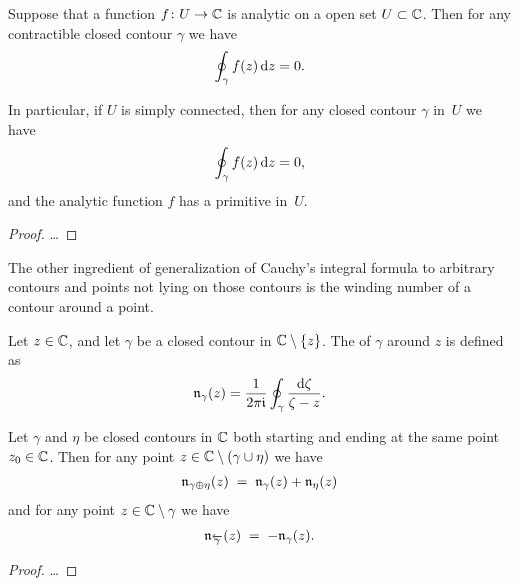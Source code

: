 \begin{theorem}
  \label{thm:cauchy_theorem}
  Suppose that a function $f \colon U \to \mathbb{C}$ is analytic on a open
  set $U \subset \mathbb{C}$.
  Then for any contractible closed contour $\gamma$ we have
  \begin{align*}
    \oint_\gamma f(z) \, \mathrm{d} z = 0 .
  \end{align*}

  In particular, if $U$ is simply connected, then
  for any closed contour $\gamma$ in~$U$ we have
  \begin{align*}
    \oint_\gamma f(z) \, \mathrm{d} z = 0 ,
  \end{align*}
  and the analytic function $f$ has a primitive in~$U$.
\end{theorem}
\begin{proof}
  \ldots
\end{proof}

The other ingredient of generalization of Cauchy's integral formula
to arbitrary contours and points not lying on those contours is
the winding number of a contour around a point.

\begin{definition}
  \label{def:winding_number}
  Let $z \in \mathbb{C}$, and let $\gamma$ be a closed contour
  in $\mathbb{C} \setminus \left\{ z \right\}$.
  The  of $\gamma$ around $z$ is defined as
  \begin{align*}
    \mathfrak{n}_{{\gamma}}(z) = \frac{1}{2\pi \mathfrak{i}} \oint_\gamma \frac{\mathrm{d} \zeta}{\zeta - z} .
  \end{align*}
\end{definition}

\begin{lemma}
  \label{lem:winding_additivity}
  Let $\gamma$ and $\eta$ be closed contours in $\mathbb{C}$
  both starting and ending at the same point $z_0 \in \mathbb{C}$.
  Then for any point $z \in \mathbb{C} \setminus (\gamma \cup \eta)$
  we have
  \begin{align*}
    \mathfrak{n}_{{\gamma \oplus \eta}}(z)
    \; = \; \mathfrak{n}_{{\gamma}}(z) + \mathfrak{n}_{{\eta}}(z)
  \end{align*}
  and for any point $z \in \mathbb{C} \setminus \gamma$ we have
  \begin{align*}
    \mathfrak{n}_{{\overleftarrow{\gamma}}}(z)
    \; = \; -\mathfrak{n}_{{\gamma}}(z) .
  \end{align*}
\end{lemma}
\begin{proof}
  \ldots
\end{proof}

